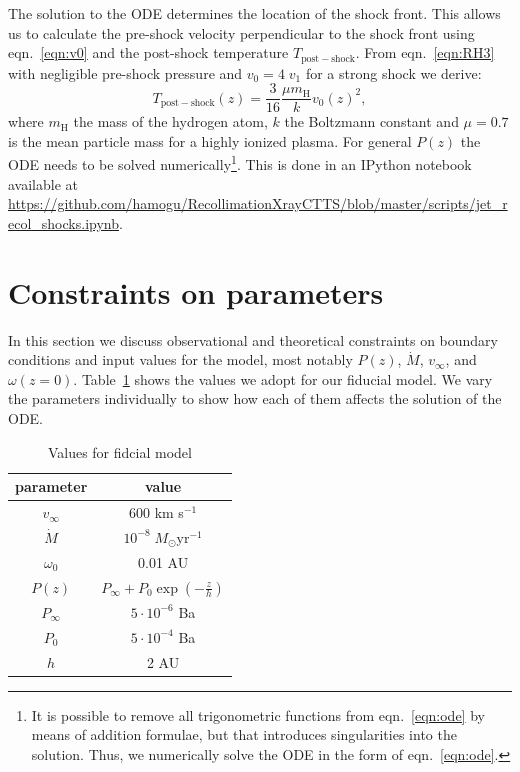 \documentclass[manuscript]{aastex}
\begin{document}
The solution to the ODE determines the location of the shock front. This allows us to calculate the pre-shock velocity perpendicular to the shock front using eqn.~\ref{eqn:v0} and the post-shock temperature $T_{\mathrm{post-shock}}$. From eqn.~\ref{eqn:RH3} with negligible pre-shock pressure and $v_0=4\;v_1$ for a strong shock we derive:
\begin{equation}
T_{\mathrm{post-shock}}(z) = \frac{3}{16} \frac{\mu m_{\textrm{H}}}{k} v_0(z)^2,\label{eqn:T}
\end{equation}
where $m_{\textrm{H}}$ the mass of the hydrogen atom, $k$ the Boltzmann constant and $\mu=0.7$ is the mean particle mass for a highly ionized plasma. For general $P(z)$ the ODE needs to be solved numerically\footnote{It is possible to remove all trigonometric functions from eqn.~\ref{eqn:ode} by means of addition formulae, but that introduces singularities into the solution. Thus, we numerically solve the ODE in the form of eqn.~\ref{eqn:ode}.}. This is done in an IPython notebook \citep{PER-GRA:2007} available at \url{https://github.com/hamogu/RecollimationXrayCTTS/blob/master/scripts/jet_recol_shocks.ipynb}.


\section{Constraints on parameters}
\label{sect:parameters}
In this section we discuss observational and theoretical constraints on boundary conditions and input values for the model, most notably $P(z)$, $\dot M$, $v_\infty$, and $\omega(z=0)$. Table~\ref{tab:fiducial} shows the values we adopt for our fiducial model. We vary the parameters individually to show how each of them affects the solution of the ODE. 
\begin{table}
\label{tab:fiducial}
\caption{Values for fidcial model}
\begin{tabular}{cc}
\hline\hline
parameter & value\\
\hline
$v_\infty$ & 600 km s$^{-1}$\\
$\dot M$ & $10^{-8}\;M_\odot\textrm{yr}^{-1}$\\
$\omega_0$ & 0.01 AU\\
$P(z)$ & $P_\infty+P_0\exp\left(-\frac{z}{h}\right)$\\
$P_\infty$ & $5\cdot 10^{-6}$ Ba\\
$P_0$ & $5\cdot 10^{-4}$ Ba\\
$h$ & 2 AU\\
\hline
\end{tabular}
\end{table}
\end{document}
